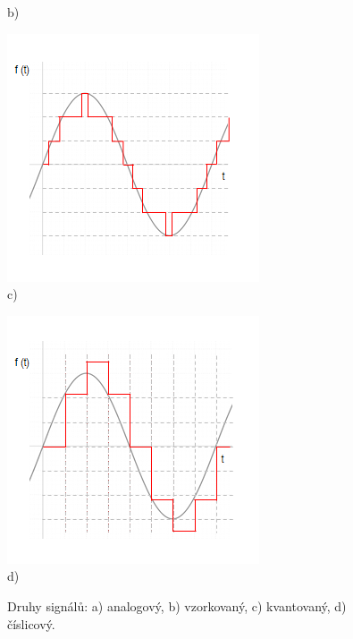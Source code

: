 \documentclass[a4paper, 12pt]{article}
\begin{document}
\begin{figure}[h!]
\begin{minipage}[c]{5cm}
  b)
  \captionsetup{labelformat=empty}
\end{minipage}\vspace{0.3cm}
\begin{minipage}[b]{5cm}
  \centering
  \includegraphics[width=\linewidth]{kvantovaný.png}\\
   c)
   \captionsetup{labelformat=empty}
\end{minipage}\hspace{1cm}
\begin{minipage}[b]{5cm}
  \centering
  \includegraphics[width=\linewidth]{číslicový.png}\\
  d)
  \captionsetup{labelformat=empty}
  
\end{minipage}
\caption{Druhy signálů: a) analogový, b) vzorkovaný, c) kvantovaný, d) číslicový.}
\label{fig:signal}
\end{figure}
\end{document}
